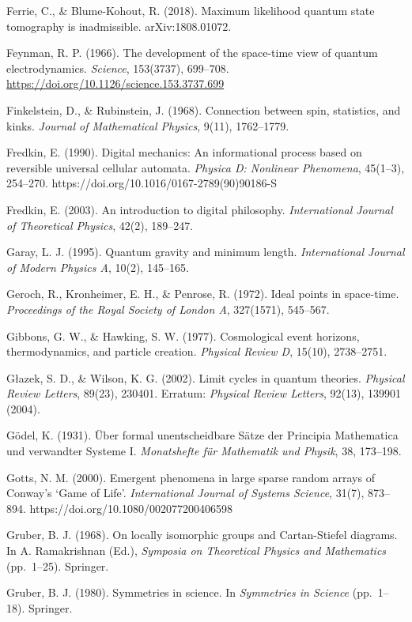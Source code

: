 \documentclass[
]{article}
\begin{document}
Ferrie, C., \& Blume-Kohout, R. (2018). Maximum likelihood quantum state
tomography is inadmissible. arXiv:1808.01072.

Feynman, R. P. (1966). The development of the space-time view of quantum
electrodynamics. \emph{Science}, 153(3737), 699--708.
\url{https://doi.org/10.1126/science.153.3737.699}

Finkelstein, D., \& Rubinstein, J. (1968). Connection between spin,
statistics, and kinks. \emph{Journal of Mathematical Physics}, 9(11),
1762--1779.

Fredkin, E. (1990). Digital mechanics: An informational process based on
reversible universal cellular automata. \emph{Physica D: Nonlinear
Phenomena}, 45(1--3), 254--270.
https://doi.org/10.1016/0167-2789(90)90186-S

Fredkin, E. (2003). An introduction to digital philosophy.
\emph{International Journal of Theoretical Physics}, 42(2), 189--247.

Garay, L. J. (1995). Quantum gravity and minimum length.
\emph{International Journal of Modern Physics A}, 10(2), 145--165.

Geroch, R., Kronheimer, E. H., \& Penrose, R. (1972). Ideal points in
space-time. \emph{Proceedings of the Royal Society of London A},
327(1571), 545--567.

Gibbons, G. W., \& Hawking, S. W. (1977). Cosmological event horizons,
thermodynamics, and particle creation. \emph{Physical Review D}, 15(10),
2738--2751.

Głazek, S. D., \& Wilson, K. G. (2002). Limit cycles in quantum
theories. \emph{Physical Review Letters}, 89(23), 230401. Erratum:
\emph{Physical Review Letters}, 92(13), 139901 (2004).

Gödel, K. (1931). Über formal unentscheidbare Sätze der Principia
Mathematica und verwandter Systeme I. \emph{Monatshefte für Mathematik
und Physik}, 38, 173--198.

Gotts, N. M. (2000). Emergent phenomena in large sparse random arrays of
Conway's `Game of Life'. \emph{International Journal of Systems
Science}, 31(7), 873--894. https://doi.org/10.1080/002077200406598

Gruber, B. J. (1968). On locally isomorphic groups and Cartan-Stiefel
diagrams. In A. Ramakrishnan (Ed.), \emph{Symposia on Theoretical
Physics and Mathematics} (pp.~1--25). Springer.

Gruber, B. J. (1980). Symmetries in science. In \emph{Symmetries in
Science} (pp.~1--18). Springer.
\end{document}
